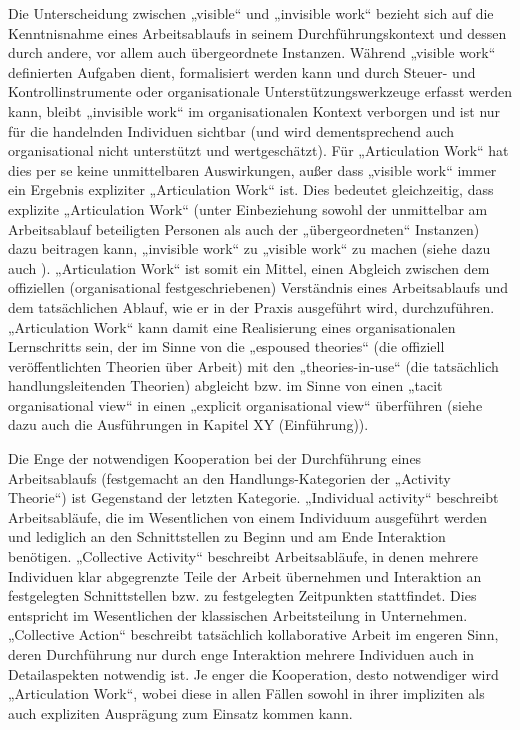 Die Unterscheidung zwischen „visible“ und „invisible work“ bezieht sich auf die Kenntnisnahme eines Arbeitsablaufs in seinem Durchführungskontext und dessen durch andere, vor allem auch übergeordnete Instanzen. Während „visible work“ definierten Aufgaben dient, formalisiert werden kann und durch Steuer- und Kontrollinstrumente oder organisationale Unterstützungswerkzeuge erfasst werden kann, bleibt „invisible work“ im organisationalen Kontext verborgen und ist nur für die handelnden Individuen sichtbar (und wird dementsprechend auch organisational nicht unterstützt und wertgeschätzt). Für „Articulation Work“ hat dies per se keine unmittelbaren Auswirkungen, außer dass „visible work“ immer ein Ergebnis expliziter „Articulation Work“ ist. Dies bedeutet gleichzeitig, dass explizite „Articulation Work“ (unter Einbeziehung sowohl der unmittelbar am Arbeitsablauf beteiligten Personen als auch der „übergeordneten“ Instanzen) dazu beitragen kann, „invisible work“ zu „visible work“ zu machen (siehe dazu auch \citep{Fujimura87}). „Articulation Work“ ist somit ein Mittel, einen Abgleich zwischen dem offiziellen (organisational festgeschriebenen) Verständnis eines Arbeitsablaufs und dem tatsächlichen Ablauf, wie er in der Praxis ausgeführt wird, durchzuführen. „Articulation Work“ kann damit eine Realisierung eines organisationalen Lernschritts sein, der im Sinne von \citet{Argyris78} die „espoused theories“ (die offiziell veröffentlichten Theorien über Arbeit) mit den „theories-in-use“ (die tatsächlich handlungsleitenden Theorien) abgleicht bzw. im Sinne von \citet{Sachs95} einen „tacit organisational view“ in einen „explicit organisational view“ überführen (siehe dazu auch die Ausführungen in Kapitel XY (Einführung)).

Die Enge der notwendigen Kooperation bei der Durchführung eines Arbeitsablaufs (festgemacht an den Handlungs-Kategorien der „Activity Theorie“) ist Gegenstand der letzten Kategorie. „Individual activity“ beschreibt Arbeitsabläufe, die im Wesentlichen von einem Individuum ausgeführt werden und lediglich an den Schnittstellen zu Beginn und am Ende Interaktion benötigen. „Collective Activity“ beschreibt Arbeitsabläufe, in denen mehrere Individuen klar abgegrenzte Teile der Arbeit übernehmen und Interaktion an festgelegten Schnittstellen bzw. zu festgelegten Zeitpunkten stattfindet. Dies entspricht im Wesentlichen der klassischen Arbeitsteilung in Unternehmen. „Collective Action“ beschreibt tatsächlich kollaborative Arbeit im engeren Sinn, deren Durchführung nur durch enge Interaktion mehrere Individuen auch in Detailaspekten notwendig ist. Je enger die Kooperation, desto notwendiger wird „Articulation Work“, wobei diese in allen Fällen sowohl in ihrer impliziten als auch expliziten Ausprägung zum Einsatz kommen kann. 

